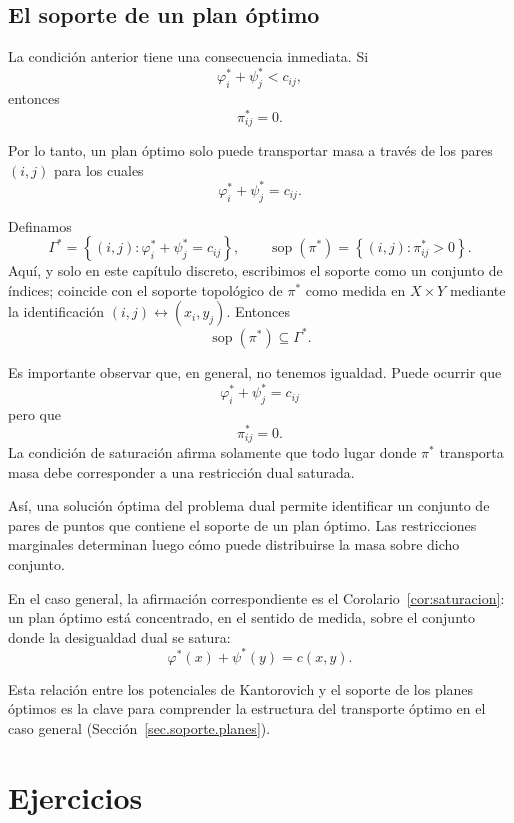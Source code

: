 \documentclass[12pt, a4paper]{amsbook}
\def\sop{\operatorname {\mathrm{sop}}}
\theoremstyle{remark}
\theoremstyle{definition}
\numberwithin{section}{chapter}
\numberwithin{subsection}{section}
\numberwithin{equation}{section}
\numberwithin{figure}{chapter}
\begin{document}
\subsection{El soporte de un plan óptimo}

La condición anterior tiene una consecuencia inmediata. Si
\[
\varphi_i^*+\psi_j^*<c_{ij},
\]
entonces
\[
\pi_{ij}^*=0.
\]

Por lo tanto, un plan óptimo solo puede transportar masa a través de los
pares $(i,j)$ para los cuales
\[
\varphi_i^*+\psi_j^*=c_{ij}.
\]

Definamos
\[
\Gamma^*
=
\left\{
(i,j):
\varphi_i^*+\psi_j^*=c_{ij}
\right\},
\qquad
\sop(\pi^*)
=
\left\{
(i,j):\pi^*_{ij}>0
\right\}.
\]
Aquí, y solo en este capítulo discreto, escribimos el soporte como un
conjunto de índices; coincide con el soporte topológico de $\pi^*$ como
medida en $X\times Y$ mediante la identificación
$(i,j)\leftrightarrow(x_i,y_j)$. Entonces
\[
\sop(\pi^*)\subseteq\Gamma^*.
\]

Es importante observar que, en general, no tenemos igualdad. Puede ocurrir
que
\[
\varphi_i^*+\psi_j^*=c_{ij}
\]
pero que
\[
\pi_{ij}^*=0.
\]
La condición de saturación afirma solamente que todo lugar donde
$\pi^*$ transporta masa debe corresponder a una restricción dual saturada.

Así, una solución óptima del problema dual permite identificar un conjunto
de pares de puntos que contiene el soporte de un plan óptimo. Las
restricciones marginales determinan luego cómo puede distribuirse la masa
sobre dicho conjunto.

En el caso general, la afirmación correspondiente es el
Corolario~\ref{cor:saturacion}: un plan óptimo está concentrado, en el sentido de medida, sobre el conjunto donde la
desigualdad dual se satura:
\[
\varphi^*(x)+\psi^*(y)=c(x,y).
\]

Esta relación entre los potenciales de Kantorovich y el soporte de los
planes óptimos es la clave para comprender la estructura del
transporte óptimo en el caso general (Sección~\ref{sec.soporte.planes}).


\section*{Ejercicios}
\end{document}
